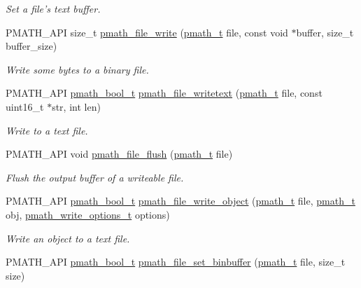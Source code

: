 \begin{CompactItemize}
\begin{CompactList}\small\item\em Set a file's text buffer. \item\end{CompactList}\item 
PMATH\_\-API size\_\-t \hyperlink{group__file__api_g085f074227d8d7ed82c0fba82fa43109}{pmath\_\-file\_\-write} (\hyperlink{classpmath__t}{pmath\_\-t} file, const void $\ast$buffer, size\_\-t buffer\_\-size)
\begin{CompactList}\small\item\em Write some bytes to a binary file. \item\end{CompactList}\item 
PMATH\_\-API \hyperlink{group__general__types_gc92090cb0b56345d6c379ed2341d4ef4}{pmath\_\-bool\_\-t} \hyperlink{group__file__api_g09096caebfcdfeb74c8f3845ff2ff262}{pmath\_\-file\_\-writetext} (\hyperlink{classpmath__t}{pmath\_\-t} file, const uint16\_\-t $\ast$str, int len)
\begin{CompactList}\small\item\em Write to a text file. \item\end{CompactList}\item 
PMATH\_\-API void \hyperlink{group__file__api_g039eb11d9dd85af6699565c6f0f0daa1}{pmath\_\-file\_\-flush} (\hyperlink{classpmath__t}{pmath\_\-t} file)
\begin{CompactList}\small\item\em Flush the output buffer of a writeable file. \item\end{CompactList}\item 
PMATH\_\-API \hyperlink{group__general__types_gc92090cb0b56345d6c379ed2341d4ef4}{pmath\_\-bool\_\-t} \hyperlink{group__file__api_gf6b8233107d3fb27e9fdabfacc8595d1}{pmath\_\-file\_\-write\_\-object} (\hyperlink{classpmath__t}{pmath\_\-t} file, \hyperlink{classpmath__t}{pmath\_\-t} obj, \hyperlink{group__objects_gd83ea6a616c49cbe35b5d3dafb877f7e}{pmath\_\-write\_\-options\_\-t} options)
\begin{CompactList}\small\item\em Write an object to a text file. \item\end{CompactList}\item 
PMATH\_\-API \hyperlink{group__general__types_gc92090cb0b56345d6c379ed2341d4ef4}{pmath\_\-bool\_\-t} \hyperlink{group__file__api_g7f852f3c8057a535541fbf64f75940d2}{pmath\_\-file\_\-set\_\-binbuffer} (\hyperlink{classpmath__t}{pmath\_\-t} file, size\_\-t size)

\end{CompactItemize}

